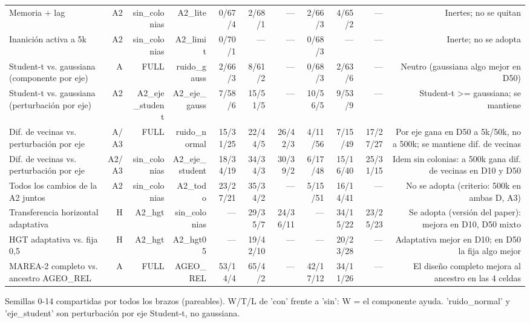 \begin{table}[ht]
\begin{tabular}{lrrrrrrrrrr}
Memoria + lag & A2 & sin\_colonias & A2\_lite & 0/67/4 & 2/68/1 & — & 2/66/3 & 4/65/2 & — & Inertes; no se quitan \\
Inanición activa a 5k & A2 & sin\_colonias & A2\_limit & 0/70/1 & — & — & 0/68/3 & — & — & Inerte; no se adopta \\
Student-t vs. gaussiana (componente por eje) & A & FULL & ruido\_gauss & 2/66/3 & 8/61/2 & — & 0/68/3 & 2/63/6 & — & Neutro (gaussiana algo mejor en D50) \\
Student-t vs. gaussiana (perturbación por eje) & A2 & A2\_eje\_student & A2\_eje\_gauss & 7/58/6 & 15/51/5 & — & 10/56/5 & 9/53/9 & — & Student-t >= gaussiana; se mantiene \\
Dif. de vecinas vs. perturbación por eje & A/A3 & FULL & ruido\_normal & 15/31/25 & 22/44/5 & 26/42/3 & 4/11/56 & 7/15/49 & 17/27/27 & Por eje gana en D50 a 5k/50k, no a 500k; se mantiene dif. de vecinas \\
Dif. de vecinas vs. perturbación por eje & A2/A3 & sin\_colonias & A2\_eje\_student & 18/34/19 & 34/34/3 & 30/39/2 & 6/17/48 & 15/16/40 & 25/31/15 & Idem sin colonias: a 500k gana dif. de vecinas en D10 y D50 \\
Todos los cambios de la A2 juntos & A2 & sin\_colonias & A2\_todo & 23/27/21 & 35/34/2 & — & 5/15/51 & 16/14/41 & — & No se adopta (criterio: 500k en ambas D, A3) \\
Transferencia horizontal adaptativa & H & A2\_hgt & sin\_colonias & — & 29/35/7 & 24/36/11 & — & 34/15/22 & 23/25/23 & Se adopta (versión del paper): mejora en D10, D50 mixto \\
HGT adaptativa vs. fija 0,5 & H & A2\_hgt & A2\_hgt05 & — & 19/42/10 & — & — & 20/23/28 & — & Adaptativa mejor en D10; en D50 la fija algo mejor \\
MAREA-2 completo vs. ancestro AGEO\_REL & A & FULL & AGEO\_REL & 53/14/4 & 65/4/2 & — & 42/17/12 & 34/11/26 & — & El diseño completo mejora al ancestro en las 4 celdas \\
\bottomrule
\end{tabular}
\par\footnotesize Semillas 0-14 compartidas por todos los brazos (pareables). W/T/L de 'con' frente a 'sin': W = el componente ayuda. 'ruido\_normal' y 'eje\_student' son perturbación por eje Student-t, no gaussiana.
\end{table}
